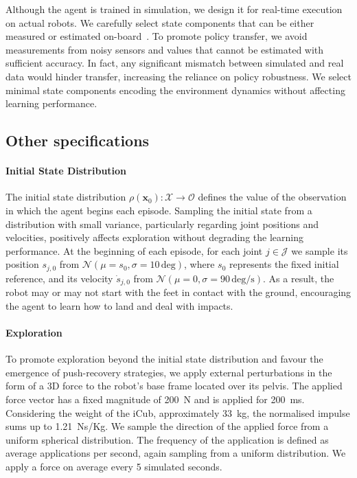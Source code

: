 \begin{addmargin}{0cm}
Although the agent is trained in simulation, we design it for real-time execution on actual robots.
We carefully select state components that can be either measured or estimated on-board~\parencite{nori_icub_2015}.
To promote policy transfer, we avoid measurements from noisy sensors and values that cannot be estimated with sufficient accuracy.
In fact, any significant mismatch between simulated and real data would hinder transfer, increasing the reliance on policy robustness.
We select minimal state components encoding the environment dynamics without affecting learning performance.

\end{addmargin}

\subsection{Other specifications}\label{sec:env-other}

\paragraph{Initial State Distribution}

The initial state distribution $\rho(\mathbf{x}_0): \mathcal{X} \to \mathcal{O}$ defines the value of the observation in which the agent begins each episode.
Sampling the initial state from a distribution with small variance, particularly regarding joint positions and velocities, positively affects exploration without degrading the learning performance.
At the beginning of each episode, for each joint $j \in \mathcal{J}$ we sample its position $s_{j,0}$ from $\mathcal{N}(\mu=s_0, \sigma=10 \, \text{deg})$, where $s_{0}$ represents the fixed initial reference, and its velocity $\dot{s}_{j,0}$ from $\mathcal{N}(\mu=0, \sigma=90 \, \text{deg/s})$.
As a result, the robot may or may not start with the feet in contact with the ground, encouraging the agent to learn how to land and deal with impacts.

\paragraph{Exploration}

To promote exploration beyond the initial state distribution and favour the emergence of push-recovery strategies, we apply external perturbations in the form of a 3D force to the robot's base frame located over its pelvis.
The applied force vector has a fixed magnitude of 200~N and is applied for 200~ms.
Considering the weight of the iCub, approximately 33~kg, the normalised impulse sums up to 1.21~Ns/Kg.
We sample the direction of the applied force from a uniform spherical distribution.
The frequency of the application is defined as average applications per second, again sampling from a uniform distribution.
We apply a force on average every 5 simulated seconds.

